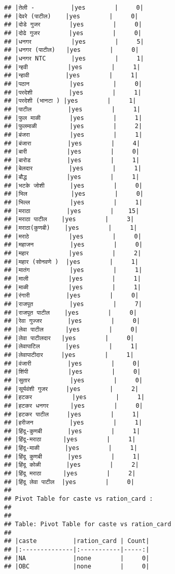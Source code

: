 \documentclass[
]{article}
\begin{document}
\begin{verbatim}
## |तेली -          |yes        |     0|
## |देवरे (पाटील)    |yes        |     0|
## |दोडे गुजर        |yes        |     0|
## |दोढे गुजर        |yes        |     0|
## |धनगर           |yes        |     5|
## |धनगर (पाटील)   |yes        |     0|
## |धनगर NTC       |yes        |     1|
## |न्हवी           |yes        |     1|
## |न्हावी          |yes        |     1|
## |पठान           |yes        |     0|
## |परदेशी          |yes        |     1|
## |परदेशी (भानटा ) |yes        |     1|
## |पाटील          |yes        |     1|
## |फुल माळी        |yes        |     1|
## |फुलमाळी         |yes        |     2|
## |बंजरा           |yes        |     1|
## |बंजारा          |yes        |     4|
## |बारी           |yes        |     0|
## |बारोड          |yes        |     1|
## |बेलदार          |yes        |     1|
## |बौद्ध           |yes        |     1|
## |भटके जोशी       |yes        |     0|
## |भिल            |yes        |     0|
## |भिल्ल           |yes        |     1|
## |मराठा          |yes        |    15|
## |मराठा पाटील    |yes        |     3|
## |मराठा(कुणबी)    |yes        |     1|
## |मराठे           |yes        |     0|
## |महाजन          |yes        |     0|
## |महार           |yes        |     2|
## |महार (सोनवणे )  |yes        |     1|
## |मातंग           |yes        |     1|
## |माली           |yes        |     1|
## |माळी           |yes        |     1|
## |रंगारी          |yes        |     0|
## |राजपूत          |yes        |     7|
## |राजपूत पाटील    |yes        |     0|
## |रेवा गुज्जर       |yes        |     0|
## |लेवा पाटील      |yes        |     0|
## |लेवा पाटीलदार   |yes        |     0|
## |लेवापाटिल       |yes        |     1|
## |लेवापाटीदार     |yes        |     1|
## |वंजारी          |yes        |     0|
## |शिंपी           |yes        |     0|
## |सुतार           |yes        |     0|
## |सूर्यवंशी गुजर     |yes        |     2|
## |हटकर           |yes        |     1|
## |हटकर धनगर      |yes        |     0|
## |हटकर पाटील     |yes        |     1|
## |हरीजन          |yes        |     1|
## |हिंदू-कुणबी       |yes        |     1|
## |हिंदू-मराठा      |yes        |     1|
## |हिंदू-माळी       |yes        |     1|
## |हिंदू कुणबी       |yes        |     1|
## |हिंदू कोळी       |yes        |     2|
## |हिंदू मराठा      |yes        |     2|
## |हिंदू लेवा पाटील  |yes        |     0|
## 
## Pivot Table for caste vs ration_card :
## 
## 
## Table: Pivot Table for caste vs ration_card
## 
## |caste          |ration_card | Count|
## |:--------------|:-----------|-----:|
## |NA             |none        |     0|
## |OBC            |none        |     0|

\end{verbatim}
\end{document}
